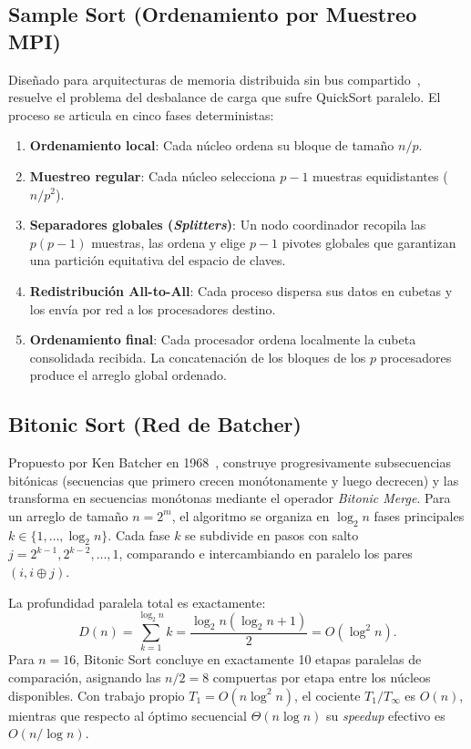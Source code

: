 \documentclass[11pt,letterpaper,oneside]{article}
\begin{document}
\subsection{Sample Sort (Ordenamiento por Muestreo MPI)}
Diseñado para arquitecturas de memoria distribuida sin bus compartido~\cite{samplesort}, resuelve el problema del desbalance de carga que sufre QuickSort paralelo. El proceso se articula en cinco fases deterministas:
\begin{enumerate}
  \item \textbf{Ordenamiento local}: Cada núcleo ordena su bloque de tamaño $n/p$.
  \item \textbf{Muestreo regular}: Cada núcleo selecciona $p-1$ muestras equidistantes ($n/p^2$).
  \item \textbf{Separadores globales (\emph{Splitters})}: Un nodo coordinador recopila las $p(p-1)$ muestras, las ordena y elige $p-1$ pivotes globales que garantizan una partición equitativa del espacio de claves.
  \item \textbf{Redistribución All-to-All}: Cada proceso dispersa sus datos en cubetas y los envía por red a los procesadores destino.
  \item \textbf{Ordenamiento final}: Cada procesador ordena localmente la cubeta consolidada recibida. La concatenación de los bloques de los $p$ procesadores produce el arreglo global ordenado.
\end{enumerate}

\subsection{Bitonic Sort (Red de Batcher)}
Propuesto por Ken Batcher en 1968~\cite{batcher}, construye progresivamente subsecuencias bitónicas (secuencias que primero crecen monótonamente y luego decrecen) y las transforma en secuencias monótonas mediante el operador \emph{Bitonic Merge}. Para un arreglo de tamaño $n = 2^m$, el algoritmo se organiza en $\log_2 n$ fases principales $k \in \{1, \dots, \log_2 n\}$. Cada fase $k$ se subdivide en pasos con salto $j = 2^{k-1}, 2^{k-2}, \dots, 1$, comparando e intercambiando en paralelo los pares $(i, i \oplus j)$.

La profundidad paralela total es exactamente:
\begin{equation}
  D(n) = \sum_{k=1}^{\log_2 n} k = \frac{\log_2 n (\log_2 n + 1)}{2} = O(\log^2 n).
  \label{eq:prof_bitonic}
\end{equation}
Para $n = 16$, Bitonic Sort concluye en exactamente 10 etapas paralelas de comparación, asignando las $n/2 = 8$ compuertas por etapa entre los núcleos disponibles. Con trabajo propio $T_1 = O(n \log^2 n)$, el cociente $T_1/T_\infty$ es $O(n)$, mientras que respecto al óptimo secuencial $\Theta(n \log n)$ su \emph{speedup} efectivo es $O(n / \log n)$.
\end{document}
